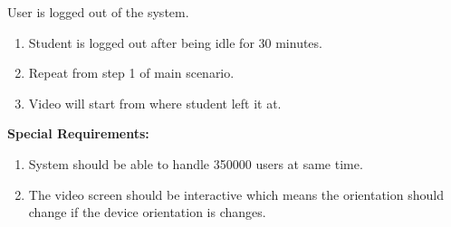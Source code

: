 \documentclass{report}
\begin{document}
User is logged out of the system.
\begin{enumerate}
    \item Student is logged out after being idle for 30 minutes.
    \item Repeat from step 1 of main scenario.
    \item Video will start from where student left it at.
\end{enumerate}
\textbf{Special Requirements:}
\begin{enumerate}
    \item System should be able to handle 350000 users at same time.
    \item The video screen should be interactive which means the orientation should change if the device orientation is changes.
\end{enumerate}
\end{document}
